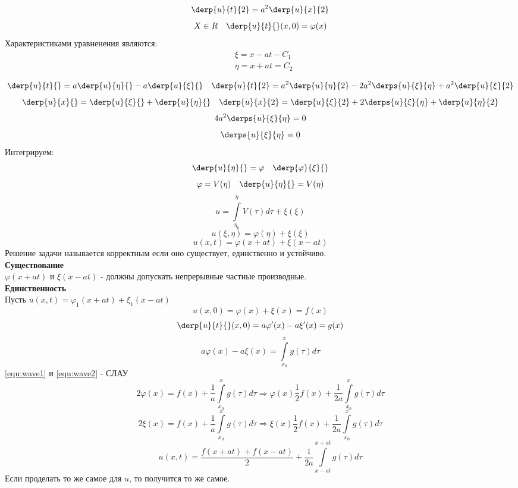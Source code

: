 \[
	\derp{u}{t}{2} = a^2 \derp{u}{x}{2}
\]
\[
	X \in R \quad \derp{u}{t}{} (x, 0) = \varphi(x)
\]
	Характеристиками уравненения являются:\
\begin{align*}
	&\xi = x - at - C_1\\
	&\eta = x + at = C_2\\
\end{align*}
\[
	\derp{u}{t}{} = a \derp{u}{\eta}{} - a \derp{u}{\xi}{} \quad \derp{u}{t}{2} = a^2 \derp{u}{\eta}{2} - 2 a^2 \derps{u}{\xi}{\eta} + a^2 \derp{u}{\xi}{2}
\]
\[
	\derp{u}{x}{} =\derp{u}{\xi}{} + \derp{u}{\eta}{} \quad \derp{u}{x}{2} = \derp{u}{\xi}{2} + 2 \derps{u}{\xi}{\eta} + \derp{u}{\eta}{2}
\]
\[
	4 a^2 \derps{u}{\xi}{\eta} = 0
\]
\[
	\derps{u}{\xi}{\eta} = 0
\]
Интегрируем:
\[
	\derp{u}{\eta}{} = \varphi \quad \derp{\varphi}{\xi}{}
\]
\[
	\varphi =V(\eta) \quad \derp{u}{\eta}{} = V(\eta)
\]
\[
	u = \int\limits_{\eta_0}^{\eta} V(\tau) d \tau + \xi (\xi)
\]
\[
	u(\xi, \eta) = \varphi(\eta) + \xi (\xi)
\]
\[
	u(x,t) = \varphi (x +at) + \xi (x - at)
\]
Решение задачи называется корректным если оно существует, единственно и устойчиво.\\

\textbf{Существование}\\
	$\varphi(x +at)$ и $\xi(x - at)$ - должны допускать непрерывные частные производные.\\

\textbf{Единственность}\\
	Пусть $u(x, t) = \varphi_1 (x + at) + \xi_1 (x - at)$\\
\begin{equation}
	u(x, 0) = \varphi (x) + \xi(x) = f(x)
	\label{equ:wave1}
\end{equation}
\[
	\derp{u}{t}{} (x, 0) = a \varphi'(x) - a \xi' (x) = g(x)
\]
\begin{equation}
	a \varphi(x) - a \xi(x) = \int\limits_{x_0}^{x} g(\tau) d \tau  
	\label{equ:wave2}
\end{equation}
\eqref{equ:wave1} и \eqref{equ:wave2} - СЛАУ
\[
	2 \varphi(x) = f(x) + \frac{1}{a} \int\limits_{x_0}^x g(\tau) d \tau \Rightarrow \varphi(x) \frac{1}{2} f(x) + \frac{1}{2a} \int\limits_{x_0}^x g(\tau) d \tau
\]
\[
	2 \xi(x) = f(x) + \frac{1}{a} \int\limits_{x_0}^x g(\tau) d \tau \Rightarrow \xi(x) \frac{1}{2} f(x) + \frac{1}{2a} \int\limits_{x_0}^x g(\tau) d \tau
\]
\[
	u(x, t) = \frac{f(x + at) + f(x - at)}{2} + \frac{1}{2a} \int\limits_{x - at}^{x + at} g (\tau) d \tau
\]
Если проделать то же самое для $u$, то получится то же самое.\\

